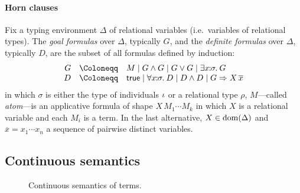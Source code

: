 \paragraph{Horn clauses}
Fix a typing environment $\Delta$ of relational variables (i.e.~variables of relational types). 
The \emph{goal formulas} over $\Delta$, typically $G$, and the \emph{definite formulas} over $\Delta$, typically $D$, are the subset of all formulas defined by induction:
\[
  \begin{array}{rcl}
    G & \Coloneqq & M \mid G \wedge G \mid G \vee G \mid \exists x\!\!:\!\!\sigma.\: G  \\
    D & \Coloneqq & \truetm \mid \forall x\!\!:\!\!\sigma.\: D \mid D \wedge D \mid G \Rightarrow X \, \overline x \\
  \end{array}
\]
in which $\sigma$ is either the type of individuals $\iota$ or a relational type $\rho$, $M$---called \emph{atom}---is an applicative formula of shape ${X \, M_1 \cdots M_k}$
in which $X$ is a relational variable and each $M_i$ is a term.
In the last alternative, $X \in \mathrm{dom}(\Delta)$ and $\overline{x} = x_1 \cdots x_n$ a sequence of pairwise distinct variables.

\subsection{Continuous semantics}

\begin{figure*}
\caption{Continuous semantics of terms.}\label{fig:cts-term-semantics}
\vspace{-12pt}
\end{figure*}

